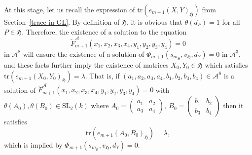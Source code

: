 \documentclass[10pt,twoside]{amsart}
\newcommand{\SL}{\mathrm{SL}}
\newcommand{\tr}{\mathrm{tr}}
\theoremstyle{definition}
\theoremstyle{definition}
\begin{document}
At this stage, let us recall the expression of $\tr(e_{m+1}(X, Y)_{\mathfrak{H}})$ from Section~\ref{trace in GL}. By definition of $\mathfrak{H}$, it is obvious that $\theta(d_P) = 1$ for all $P \in \mathfrak{H}$. Therefore, the existence of a solution to the equation 
$$\widetilde F_{m+1}^{\mathcal{A}}(x_1, x_2, x_3, x_4, y_1, y_2, y_3, y_4) = 0$$ 
in $\mathcal{A}^8$ will ensure the existence of a solution of $\Phi_{m+1}(s_{m_{\mathfrak{H}}}, v_{\mathfrak{H}}, d_{Y})=0$ in $\mathcal{A}^3$, and these facts further imply the existence of matrices $X_0, Y_0\in \mathfrak{H}$ which satisfies $\tr(e_{m+1}(X_0, Y_0)_{\mathfrak{H}}) = \lambda$. 
That is, if $(a_1, a_2, a_3, a_4, b_1, b_2, b_3, b_4)\in \mathcal{A}^8$ is a solution of  $\widetilde F_{m+1}^{\mathcal{A}}(x_1, x_2, x_3, x_4, y_1, y_2, y_3, y_4) = 0$ with $\theta(A_0), \theta(B_0)\in \SL_2(k)$ where $A_0=\left(\begin{array}{cc}  a_1 & a_2 \\  a_3 & a_4
\end{array}\right),\ B_0=\left(\begin{array}{cc}  b_1 & b_2 \\
b_3 & b_4 \end{array}\right)$ then it satisfies 
$$\tr(e_{m+1}(A_0, B_0)_{\mathfrak{H}}) = \lambda,$$ 
which is implied by $\Phi_{m+1}(s_{m_{\mathfrak{H}}}, v_{\mathfrak{H}}, d_{Y})=0$.
\end{document}
